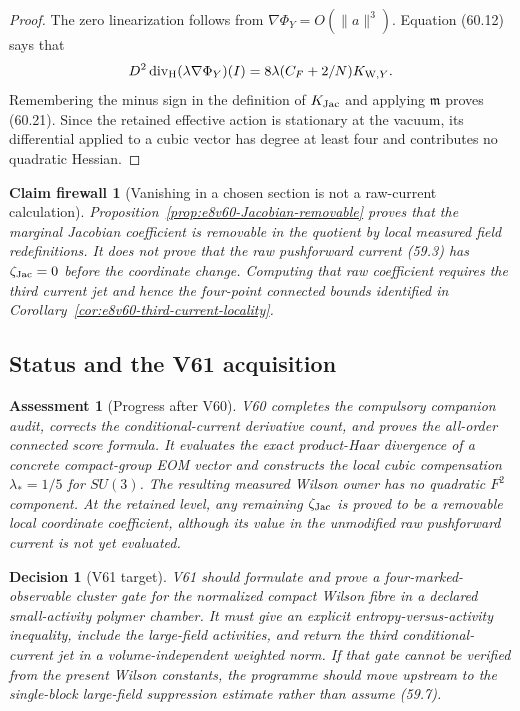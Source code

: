 \documentclass[11pt,oneside]{book}
\newtheorem{assessment}[theorem]{Assessment}
\newtheorem{firewall}[theorem]{Claim firewall}
\newtheorem{decision}[theorem]{Decision}
\theoremstyle{definition}
\theoremstyle{remark}
\begin{document}
\begin{proof}
The zero linearization follows from
\(\nabla\Phi_Y=O(\|a\|^3)\).  Equation (60.12) says that
\[
 D^2\operatorname{div}_{\rm H}(\lambda\nabla\Phi_Y)(I)
 =8\lambda(C_F+2/N)K_{{\rm W},Y}.
\]
Remembering the minus sign in the definition of \(K_{\rm Jac}\)
and applying \({\mathfrak m}\) proves (60.21).  Since the retained
effective action is stationary at the vacuum, its differential
applied to a cubic vector has degree at least four and contributes
no quadratic Hessian.
\end{proof}

\begin{firewall}[Vanishing in a chosen section is not a raw-current
calculation]
\label{fire:e8v60-section-vs-raw}
Proposition~\ref{prop:e8v60-Jacobian-removable} proves that the
marginal Jacobian coefficient is removable in the quotient by local
measured field redefinitions.  It does not prove that the raw
pushforward current (59.3) has \(\zeta_{\rm Jac}=0\) before the
coordinate change.  Computing that raw coefficient requires the
third current jet and hence the four-point connected bounds identified
in Corollary~\ref{cor:e8v60-third-current-locality}.
\end{firewall}

\subsection{Status and the V61 acquisition}

\begin{assessment}[Progress after V60]
\label{ass:e8v60-status}
V60 completes the compulsory companion audit, corrects the
conditional-current derivative count, and proves the all-order
connected score formula.  It evaluates the exact product-Haar
divergence of a concrete compact-group EOM vector and constructs the
local cubic compensation \(\lambda_*=1/5\) for \(SU(3)\).  The
resulting measured Wilson owner has no quadratic \(F^2\) component.
At the retained level, any remaining \(\zeta_{\rm Jac}\) is proved
to be a removable local coordinate coefficient, although its value
in the unmodified raw pushforward current is not yet evaluated.
\end{assessment}

\begin{decision}[V61 target]
\label{dec:e8v60-next}
V61 should formulate and prove a four-marked-observable cluster
gate for the normalized compact Wilson fibre in a declared
small-activity polymer chamber.  It must give an explicit
entropy-versus-activity inequality, include the large-field
activities, and return the third conditional-current jet in a
volume-independent weighted norm.  If that gate cannot be verified
from the present Wilson constants, the programme should move
upstream to the single-block large-field suppression estimate rather
than assume (59.7).
\end{decision}
\end{document}
